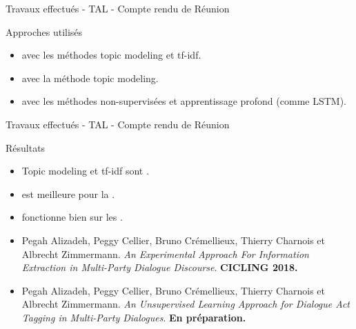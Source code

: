 \documentclass{beamer}
\newcommand{\imp}[1]{{\color{red}{#1}}}
\begin{document}
{{\begin{frame}{Travaux effectués - TAL - Compte rendu de Réunion }
\begin{block}{Approches utilisés}
\begin{itemize}
	\item \imp{Regroupement des réunions} avec les méthodes topic modeling et tf-idf.
	\item \imp{Caractérisations de chaque réunions} avec la méthode topic modeling. 
	\item \imp{Identification des actes de dialogues} avec les méthodes non-supervisées et apprentissage profond (comme LSTM).
\end{itemize}
\end{block}
\end{frame}


\begin{frame}{Travaux effectués - TAL - Compte rendu de Réunion }

\begin{block}{Résultats}
\begin{itemize}
\item Topic modeling  et tf-idf sont \imp{complémentaire}. 
\item \imp{topic modeling} est meilleure pour la \imp{synthèse et l'extraction de thème}.
\item \imp{tf-idf} fonctionne bien sur les \imp{caractérisations de réunion}.
\end{itemize}
\end{block}

\begin{itemize}
\small
\item Pegah Alizadeh, Peggy Cellier, Bruno Crémellieux, Thierry Charnois et Albrecht Zimmermann. \textit{An Experimental Approach For Information Extraction in Multi-Party Dialogue Discourse}. \textbf{CICLING 2018.}
\item Pegah Alizadeh, Peggy Cellier, Bruno Crémellieux, Thierry Charnois et Albrecht Zimmermann. \textit{An Unsupervised Learning Approach for Dialogue Act Tagging in Multi-Party Dialogues}. \textbf{En préparation.}
\end{itemize}

\end{frame}

}}
\end{document}
